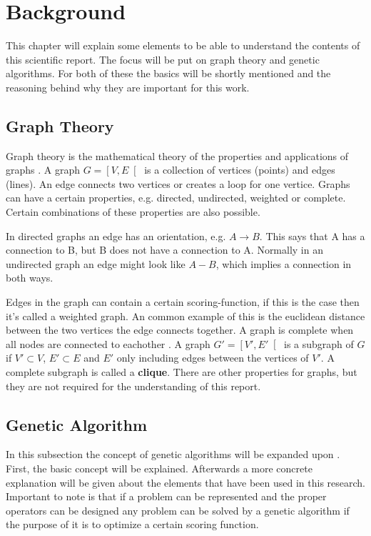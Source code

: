 \section{Background}
\label{sec:background}
This chapter will explain some elements to be able to understand the contents of this scientific report.
The focus will be put on graph theory and genetic algorithms.
For both of these the basics will be shortly mentioned and the reasoning behind why they are important for this work.

\subsection{Graph Theory}
Graph theory is the mathematical theory of the properties and applications of graphs \cite{Demoen}.
A graph $G=\left[V,E\right[$ is a collection of vertices (points) and edges (lines).
An edge connects two vertices or creates a loop for one vertice.
Graphs can have a certain properties, e.g. directed, undirected, weighted or complete.
Certain combinations of these properties are also possible.

In directed graphs an edge has an orientation, e.g. $A \rightarrow B$. This says that A has a connection to B, but B does not have a connection to A.
Normally in an undirected graph an edge might look like $A - B$, which implies a connection in both ways.

Edges in the graph can contain a certain scoring-function, if this is the case then it's called a weighted graph.
An common example of this is the euclidean distance between the two vertices the edge connects together.
A graph is complete when all nodes are connected to eachother \cite{Demoen}.
A graph $G'=\left[V',E'\right[$ is a subgraph of $G$ if $V' \subset V$, $E' \subset E$ and $E'$ only including edges between the vertices of $V'$.
A complete subgraph is called a \textbf{clique}.
There are other properties for graphs, but they are not required for the understanding of this report.

\subsection{Genetic Algorithm}
In this subsection the concept of genetic algorithms will be expanded upon \cite{genetics}. 
First, the basic concept will be explained. 
Afterwards a more concrete explanation will be given about the elements that have been used in this research.
Important to note is that if a problem can be represented and the proper operators can be designed any problem can be solved by a genetic algorithm if the purpose of it is to optimize a certain scoring function.

